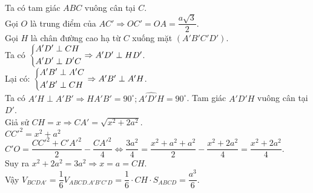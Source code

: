 \begin{ex}
{\begin{center}
		\end{center}
		Ta có tam giác $ABC$ vuông cân tại $C$.\\
		Gọi $O$ là trung điểm của $AC'\Rightarrow OC'=OA=\dfrac{a\sqrt{3}}{2}$.\\
		Gọi $H$ là chân đường cao hạ từ $C$ xuống mặt $(A'B'C'D')$.\\
		Ta có $\left\{\begin{aligned}&A'D'\perp CH \\& A'D'\perp D'C\end{aligned}\right.\Rightarrow A'D'\perp HD'$.\\
		Lại có: $\left\{\begin{aligned}&A'B'\perp A'C \\&A'B'\perp CH\end{aligned}\right.\Rightarrow A'B'\perp A'H$.\\
		Ta có $A'H\perp A'B'\Rightarrow \widehat{HA'B'}=90^\circ;\widehat{A'D'H}=90^\circ$. Tam giác $A'D'H$ vuông cân tại $D'$.\\
		Giả sử $CH=x\Rightarrow CA'=\sqrt{x^2+2a^2}$.\\
		$CC'^2=x^2+a^2$\\
		$C'O=\dfrac{CC'^2+C'A'^2}{2}-\dfrac{CA'^2}{4}\Leftrightarrow \dfrac{3a^2}{4}=\dfrac{x^2+a^2+a^2}{2}-\dfrac{x^2+2a^2}{4}=\dfrac{x^2+2a^2}{4}$.\\
		Suy ra $x^2+2a^2=3a^2\Rightarrow x=a=CH$.\\
		Vậy $V_{BCDA'}=\dfrac{1}{6}V_{ABCD.A'B'C'D}=\dfrac{1}{6}\cdot CH\cdot{S_{ABCD}}=\dfrac{a^3}{6}$.}
\end{ex}
